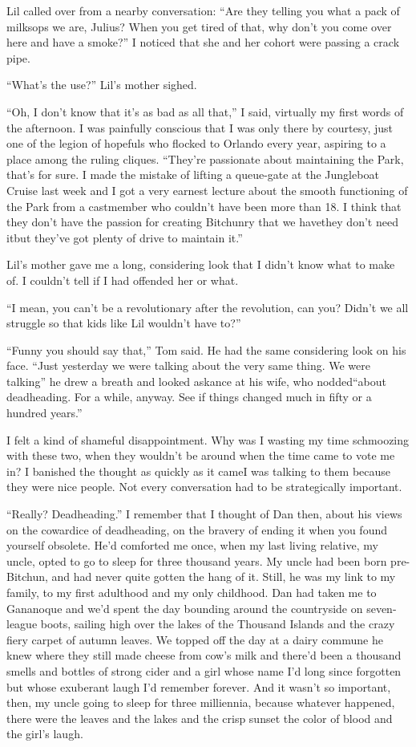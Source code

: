 Lil called over from a nearby conversation: “Are they telling you
what a pack of milksops we are, Julius? When you get tired of that,
why don't you come over here and have a smoke?” I noticed that she
and her cohort were passing a crack pipe.

“What's the use?” Lil's mother sighed.

“Oh, I don't know that it's as bad as all that,” I said, virtually
my first words of the afternoon. I was painfully conscious that I
was only there by courtesy, just one of the legion of hopefuls who
flocked to Orlando every year, aspiring to a place among the ruling
cliques. “They're passionate about maintaining the Park, that's for
sure. I made the mistake of lifting a queue-gate at the Jungleboat
Cruise last week and I got a very earnest lecture about the smooth
functioning of the Park from a castmember who couldn't have been
more than 18. I think that they don't have the passion for creating
Bitchunry that we have{\dash}they don't need it{\dash}but they've got plenty of
drive to maintain it.”

Lil's mother gave me a long, considering look that I didn't know
what to make of. I couldn't tell if I had offended her or what.

“I mean, you can't be a revolutionary after the revolution, can
you? Didn't we all struggle so that kids like Lil wouldn't have
to?”

“Funny you should say that,” Tom said. He had the same considering
look on his face. “Just yesterday we were talking about the very
same thing. We were talking{\dash}” he drew a breath and looked askance
at his wife, who nodded{\dash}“about deadheading. For a while, anyway.
See if things changed much in fifty or a hundred years.”

I felt a kind of shameful disappointment. Why was I wasting my time
schmoozing with these two, when they wouldn't be around when the
time came to vote me in? I banished the thought as quickly as it
came{\dash}I was talking to them because they were nice people. Not every
conversation had to be strategically important.

“Really? Deadheading.” I remember that I thought of Dan then, about
his views on the cowardice of deadheading, on the bravery of ending
it when you found yourself obsolete. He'd comforted me once, when
my last living relative, my uncle, opted to go to sleep for three
thousand years. My uncle had been born pre-Bitchun, and had never
quite gotten the hang of it. Still, he was my link to my family, to
my first adulthood and my only childhood. Dan had taken me to
Gananoque and we'd spent the day bounding around the countryside on
seven-league boots, sailing high over the lakes of the Thousand
Islands and the crazy fiery carpet of autumn leaves. We topped off
the day at a dairy commune he knew where they still made cheese
from cow's milk and there'd been a thousand smells and bottles of
strong cider and a girl whose name I'd long since forgotten but
whose exuberant laugh I'd remember forever. And it wasn't so
important, then, my uncle going to sleep for three milliennia,
because whatever happened, there were the leaves and the lakes and
the crisp sunset the color of blood and the girl's laugh.

